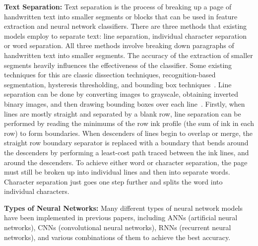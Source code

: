\textbf{Text Separation:} Text separation is the process of breaking up a page of handwritten text into smaller segments or blocks that can be used in feature extraction and neural network classifiers. There are three methods that existing models employ to separate text: line separation, individual character separation or word separation. All three methods involve breaking down paragraphs of handwritten text into smaller segments. The accuracy of the extraction of smaller segments heavily influences the effectiveness of the classifier. Some existing techniques for this are classic dissection techniques, recognition-based segmentation, hysteresis thresholding, and bounding box techniques~\cite{chen2023}. Line separation can be done by converting images to grayscale, obtaining inverted binary images, and then drawing bounding boxes over each line~\cite{hemanth2022}. Firstly, when lines are mostly straight and separated by a blank row, line separation can be performed by reading the minimums of the row ink profile (the sum of ink in each row) to form boundaries. When descenders of lines begin to overlap or merge, the straight row boundary separator is replaced with a boundary that bends around the descenders by performing a least-cost path traced between the ink lines, and around the descenders.
To achieve either word or character separation, the page must still be broken up into individual lines and then into separate words. Character separation just goes one step further and splits the word into individual characters.

\textbf{Types of Neural Networks:} Many different types of neural network models have been implemented in previous papers, including ANNs (artificial neural networks), CNNs (convolutional neural networks), RNNs (recurrent neural networks), and various combinations of them to achieve the best accuracy.

